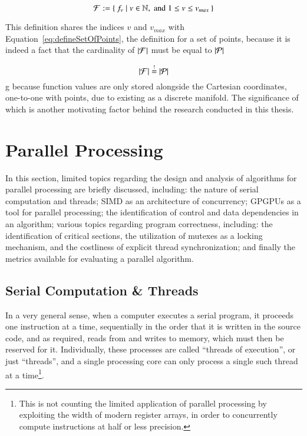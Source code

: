\begin{equation}
	\mathcal{F} := \left \{\: f_v \mid v \in \mathbb{N}, \;\text{and}\; 1\leq v \leq v_{max} \:\right \}
	\label{eq:defineSetOfFunctionValues}
\end{equation}%
%
%

This definition shares the indices $v$ and $v_{max}$ with Equation~\ref{eq:defineSetOfPoints}, the definition for a set of points, because it is indeed a fact that the cardinality of $|\mathcal{F}|$ must be equal to $|\mathcal{P}|$

\begin{equation}
	|\mathcal{F}| \overset{!}{=} |\mathcal{P}|
\end{equation}
g
because function values are only stored alongside the Cartesian coordinates, one-to-one with points, due to \tdd{} existing as a discrete manifold. The significance of which is another motivating factor behind the research conducted in this thesis.

%
%
%
%
%
%
\section{Parallel Processing}
\label{ch2sPP}
In this section, limited topics regarding the design and analysis of algorithms for parallel processing are briefly discussed, including: the nature of serial computation and threads; \gls{SIMD} as an architecture of concurrency; \glspl{GPGPU} as a tool for parallel processing; the identification of control and data dependencies in an algorithm; various topics regarding program correctness, including: the identification of critical sections, the utilization of mutexes as a locking mechanism, and the costliness of explicit thread synchronization; and finally the metrics available for evaluating a parallel algorithm.

%
%
%
%
\subsection{Serial Computation \& Threads}
\label{ch2sPPssSCT}
In a very general sense, when a computer executes a serial program, it proceeds one instruction at a time, sequentially in the order that it is written in the source code, and as required, reads from and writes to memory, which must then be reserved for it. Individually, these processes are called ``threads of execution'', or just ``\glspl{thread}'', and a single processing core can only process a single such thread at a time\footnote{This is not counting the limited application of parallel processing by exploiting the width of modern register arrays, in order to concurrently compute instructions at half or less precision.}.

